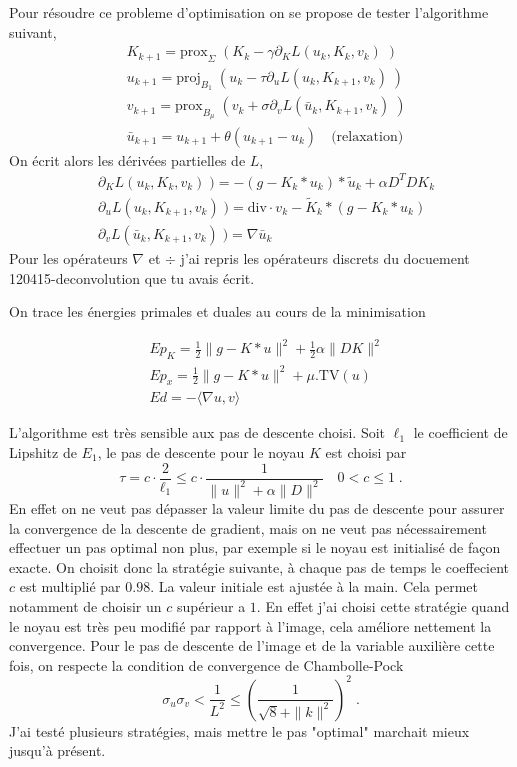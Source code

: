 \documentclass[a4paper]{article}
\begin{document}
Pour résoudre ce probleme d'optimisation on se propose de tester l'algorithme suivant,
\begin{align}
& K_{k+1} = \text{prox}_{\Sigma} \; (K_k - \gamma \partial_K L(u_k,K_k,v_k) \; )\\
& u_{k+1} = \text{proj}_{B_1} \; (u_k - \tau \partial_u L(u_k,K_{k+1},v_k) \; )\\
& v_{k+1}         = \text{prox}_{B_\mu} \; (v_k + \sigma \partial_v L (\bar{u}_k,K_{k+1},v_k) \; )\\
&\bar{u}_{k+1} = u_{k+1} + \theta (u_{k+1} - u_k) \quad \text{(relaxation)}
\end{align}
On écrit alors les dérivées partielles de $L$,
\begin{align}
& \partial_K L(u_k,K_k,v_k) \; ) = - (g-K_k*u_k)*\tilde{u}_k+ \alpha D^TDK_k \\
& \partial_u L(u_k,K_{k+1},v_k) \; ) = \text{div} \cdot v_k - \tilde{K}_k * (g-K_k*u_k)\\
& \partial_v L (\bar{u}_k,K_{k+1},v_k) \; ) =  \nabla \bar{u}_k
\end{align}
Pour les opérateurs $\nabla$ et $\div$ j'ai repris les opérateurs discrets du docuement 120415-deconvolution que tu avais écrit.

On trace les énergies primales et duales au cours de la minimisation

\begin{align}
& Ep_K = \frac{1}{2} \| g - K * u\|^2 
+ \frac{1}{2} \alpha \| D K \|^2\\
& Ep_x = \frac{1}{2} \| g - K * u\|^2 
+ \mu. \text{TV} (u)  \\
& Ed = - \langle \nabla u ,v \rangle 
\end{align}

L'algorithme est très sensible aux pas de descente choisi.
Soit $\ell_1$ le coefficient de Lipshitz de $E_1$, le pas de descente pour le noyau $K$
est choisi par
\[
\tau = c \cdot \frac{2}{\ell_1} \leq  c \cdot \frac{1}{\|u\|^2 + \alpha \|D\|^2} \quad 0<c \leq 1 \; .
\]
En effet on ne veut pas dépasser la valeur limite du pas de descente pour assurer la convergence de la descente de gradient, mais on ne veut pas nécessairement effectuer un pas optimal non plus, par exemple si le noyau est initialisé de façon exacte.
On choisit donc la stratégie suivante, à chaque pas de temps le coeffecient $c$ est multiplié par $0.98$. La valeur initiale est ajustée à la main. Cela permet notamment de choisir un $c$ supérieur a $1$. En effet j'ai choisi cette stratégie quand le noyau est très peu modifié par rapport à l'image, cela améliore nettement la convergence.
Pour le pas de descente de l'image et de la variable auxilière cette fois, on respecte la condition de convergence de Chambolle-Pock
\[
\sigma_u \sigma_v <\frac{1}{L^2} \leq \left(\frac{1}{\sqrt{8} + \| k \|^2} \right)^2
\; .
\]
J'ai testé plusieurs stratégies, mais mettre le pas "optimal" marchait mieux jusqu'à présent.
\end{document}
